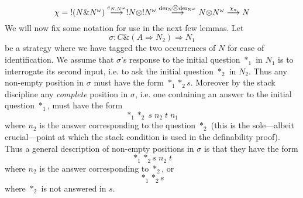 \documentclass[11pt]{article}
\newcommand{\with}{\mbox{$\&$}}
\newcommand{\tensor}{\mbox{$\otimes$}}
\begin{document}
$$\chi =\; !(N\with N^{\omega})
\stackrel{e_{N,N^{\omega}}}{\longrightarrow}
!N\tensor
!N^{\omega}\stackrel{\rm{der}_N\tensor\rm{der}_{N^{\omega}}}{\longrightarrow}
N\tensor N^{\omega}\stackrel{\chi_a}{\longrightarrow}N$$
We will now fix some notation for use in the next few lemmas. Let
$$\sigma : C\with (A\Rightarrow N_2) \Rightarrow N_1$$
be a strategy where we have tagged the two occurrences of $N$ for
ease of identification. We assume that $\sigma$'s response to the
initial question $*_1$ in $N_1$ is to interrogate its second input,
i.e. to ask the initial question $*_2$ in $N_2$. Thus any non-empty
position in $\sigma$ must have the form $*_1 *_2 s$. Moreover by the
stack discipline any {\em complete} position in $\sigma$, i.e. one
containing an answer to the initial question $*_1$, must have the form
$$ *_1 *_2 \; s\;  n_2 \; t \; n_1$$
where $n_2$ is the answer corresponding to the question $*_2$ (this is
the sole---albeit crucial---point at which the stack condition is used
in the definability proof). Thus a general description of non-empty
positions in $\sigma$ is that they have the form
$$ *_1 *_2 s \; n_2 \;t$$
where $n_2$ is the answer corresponding to $*_2$, or
$$*_1 *_2 s$$
where $*_2$ is not answered in $s$.
\end{document}
